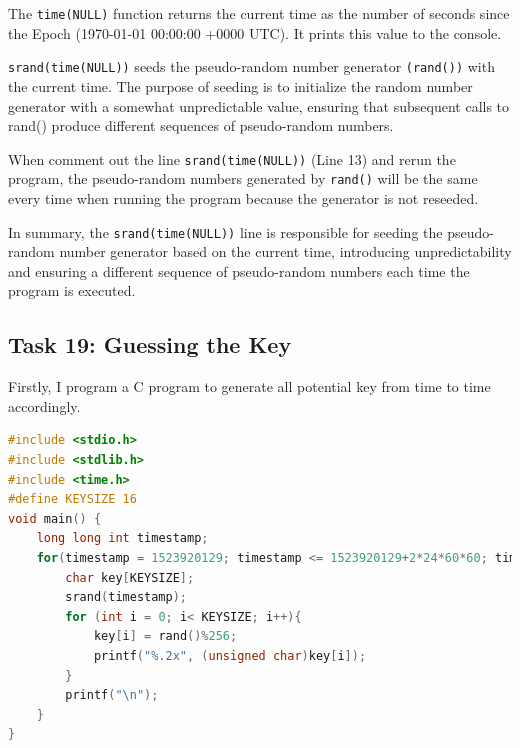 \documentclass[a4paper,11pt]{article}
\begin{document}
The \verb|time(NULL)| function returns the current time as the number of seconds since the Epoch (1970-01-01 00:00:00 +0000 UTC). It prints this value to the console.

\verb|srand(time(NULL))| seeds the pseudo-random number generator \verb|(rand())| with the current time. The purpose of seeding is to initialize the random number generator with a somewhat unpredictable value, ensuring that subsequent calls to rand() produce different sequences of pseudo-random numbers.

When comment out the line \verb|srand(time(NULL))| (Line 13) and rerun the program, the pseudo-random numbers generated by \verb|rand()| will be the same every time when running the program because the generator is not reseeded. 

In summary, the \verb|srand(time(NULL))| line is responsible for seeding the pseudo-random number generator based on the current time, introducing unpredictability and ensuring a different sequence of pseudo-random numbers each time the program is executed.

\subsection{Task 19: Guessing the Key}
Firstly, I program a C program to generate all potential key from time to time accordingly.
\begin{lstlisting}[caption={C Program Code for Generating Keys},label={lst:task19-1},language=C,breaklines=true]
#include <stdio.h>
#include <stdlib.h>
#include <time.h>
#define KEYSIZE 16
void main() {
    long long int timestamp;
    for(timestamp = 1523920129; timestamp <= 1523920129+2*24*60*60; timestamp++) {
        char key[KEYSIZE];
        srand(timestamp);
        for (int i = 0; i< KEYSIZE; i++){
            key[i] = rand()%256;
            printf("%.2x", (unsigned char)key[i]);
        }
        printf("\n");
    }
}
\end{lstlisting} 
\end{document}
